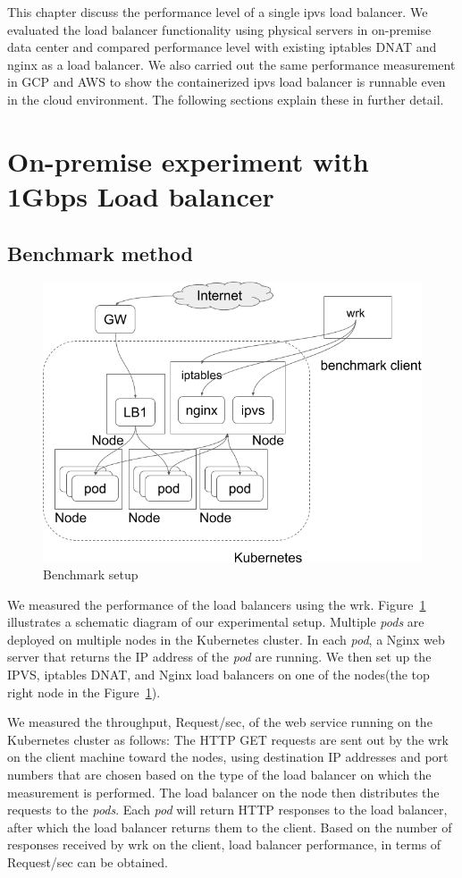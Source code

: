 This chapter discuss the performance level of a single ipvs load balancer.
We evaluated the load balancer functionality using physical servers in on-premise data center and compared performance level with existing iptables DNAT and nginx as a load balancer.
We also carried out the same performance measurement in GCP and AWS to show the containerized ipvs load balancer is runnable even in the cloud environment.
The following sections explain these in further detail. 

\section{On-premise experiment with 1Gbps Load balancer}
\subsection{Benchmark method}

\begin{figure}
  \centering
  \includegraphics[width=0.8\columnwidth]{Figs/benchmark-schem}
  \caption{Benchmark setup}
  \label{fig:benchmark-schem}
\end{figure}

We measured the performance of the load balancers using the wrk.
Figure~\ref{fig:benchmark-schem} illustrates a schematic diagram of our experimental setup.
Multiple {\em pods} are deployed on multiple nodes in the Kubernetes cluster. 
In each {\em pod}, a Nginx web server that returns the IP address of the {\em pod} are running.
We then set up the IPVS, iptables DNAT, and Nginx load balancers on one of the nodes(the top right node in the Figure~\ref{fig:benchmark-schem}). 

We measured the throughput, Request/sec, of the web service running on the Kubernetes cluster as follows:
The HTTP GET requests are sent out by the wrk on the client machine toward the nodes,
using destination IP addresses and port numbers that are chosen based on the type of the load balancer on which the measurement is performed.
The load balancer on the node then distributes the requests to the {\em pods}.
Each {\em pod} will return HTTP responses to the load balancer, after which the load balancer returns them to the client.
Based on the number of responses received by wrk on the client, 
load balancer performance, in terms of Request/sec can be obtained. 

